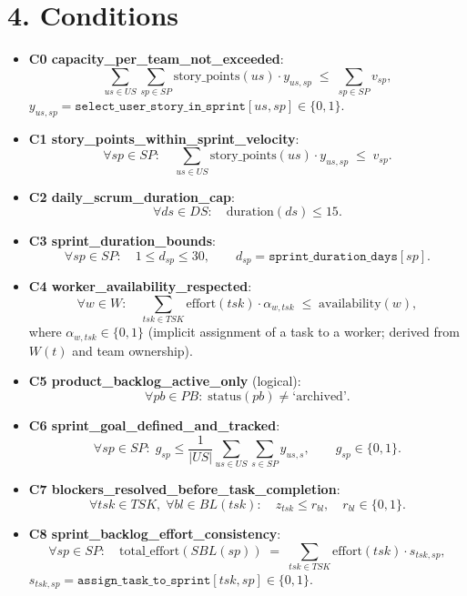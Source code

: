 \documentclass[11pt]{article}
\begin{document}
\section{4. Conditions}
\begin{itemize}
  \item \textbf{C0 capacity\_per\_team\_not\_exceeded}:
  \[
    \sum_{us\in US}\sum_{sp\in SP}\text{story\_points}(us)\cdot y_{us,sp} \;\le\; \sum_{sp\in SP} v_{sp},
  \]
  $y_{us,sp}=\texttt{select\_user\_story\_in\_sprint}[us,sp]\in\{0,1\}$.

  \item \textbf{C1 story\_points\_within\_sprint\_velocity}:
  \[
    \forall sp\in SP:\quad \sum_{us\in US}\text{story\_points}(us)\cdot y_{us,sp} \;\le\; v_{sp}.
  \]

  \item \textbf{C2 daily\_scrum\_duration\_cap}:
  \[
    \forall ds\in DS:\quad \text{duration}(ds)\le 15.
  \]

  \item \textbf{C3 sprint\_duration\_bounds}:
  \[
    \forall sp\in SP:\quad 1 \le d_{sp}\le 30,\qquad d_{sp}=\texttt{sprint\_duration\_days}[sp].
  \]

  \item \textbf{C4 worker\_availability\_respected}:
  \[
    \forall w\in W:\quad \sum_{tsk\in TSK}\text{effort}(tsk)\cdot \alpha_{w,tsk} \;\le\; \text{availability}(w),
  \]
  where $\alpha_{w,tsk}\in\{0,1\}$ (implicit assignment of a task to a worker; derived from $W(t)$ and team ownership).

  \item \textbf{C5 product\_backlog\_active\_only} (logical):
  \[
    \forall pb\in PB:\; \text{status}(pb)\neq \text{`archived'}.
  \]

  \item \textbf{C6 sprint\_goal\_defined\_and\_tracked}:
  \[
    \forall sp\in SP:\; g_{sp}\le \frac{1}{|US|}\sum_{us\in US}\sum_{s\in SP} y_{us,s},\qquad g_{sp}\in\{0,1\}.
  \]

  \item \textbf{C7 blockers\_resolved\_before\_task\_completion}:
  \[
    \forall tsk\in TSK,\;\forall bl\in BL(tsk):\quad z_{tsk}\le r_{bl},\quad r_{bl}\in\{0,1\}.
  \]

  \item \textbf{C8 sprint\_backlog\_effort\_consistency}:
  \[
    \forall sp\in SP:\quad \text{total\_effort}(SBL(sp)) \;=\; \sum_{tsk\in TSK}\text{effort}(tsk)\cdot s_{tsk,sp},
  \]
  $s_{tsk,sp}=\texttt{assign\_task\_to\_sprint}[tsk,sp]\in\{0,1\}$.


\end{itemize}
\end{document}
